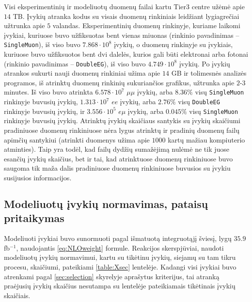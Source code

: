 \documentclass[a4paper, 12pt]{article}
\newcommand{\ttt}[1]{\texttt{#1}}
\newcommand{\emu}{e\mu}
\newcommand{\mumu}{\mu\mu}
\newcommand{\invfb}{fb$^{-1}$}
\newlength\q
\begin{document}
Visi eksperimentinių ir modeliuotų duomenų failai kartu Tier3 centre užėmė apie $14$ TB.
Įvykių atranka kodus su visais duomenų rinkiniais leidžiant lygiagrečiai užtrunka apie $5$ valandas.
Eksperimentinių duomenų rinkinyje, kuriame laikomi įvykiai, kuriuose buvo užfiksuotas bent vienas miuonas
(rinkinio pavadinimas -- \ttt{SingleMuon}), iš viso buvo $7.868 \cdot 10^8$ įvykių, o duomenų rinkinyje su įvykiais,
kuriuose buvo užfiksuotos bent dvi dalelės, kurios gali būti elektronai arba fotonai (rinkinio pavadinimas --
\ttt{DoubleEG}), iš viso buvo $4.749 \cdot 10^8$ įvykių.
Po įvykių atrankos sukurti nauji duomenų rinkiniai užima apie $14$ GB ir tolimesnės analizės programos, iš atrinktų
duomenų rinkinių sukuriančios grafikus, užtrunka apie $2$-$3$ minutes.
Iš viso buvo atrinkta $6.578 \cdot 10^7$ $\mumu$ įvykių, arba $8.36\%$ visų \ttt{SingleMuon} rinkinyje buvusių įvykių,
$1.313 \cdot 10^7$ $ee$ įvykių, arba $2.76\%$ visų \ttt{DoubleEG} rinkinyje buvusių įvykių, ir $3.556 \cdot 10^5$
$\emu$ įvykių, arba $0.045\%$ visų \ttt{SingleMuon} rinkinyje buvusių įvykių.
Atrinktų įvykių skaičiaus santykis su įvykių skaičiumi pradiniuose duomenų rinkiniuose nėra lygus atrinktų ir pradinių
duomenų failų apimčių santykiui (atrinkti duomenys užima apie $1000$ kartų mažiau kompiuterio atminties).
Taip yra todėl, kad failų dydžių sumažėjimą nulėmė ne tik juose esančių įvykių skaičius, bet ir tai, kad atrinktuose
duomenų rinkiniuose buvo saugoma tik maža dalis pradiniuose duomenų rinkiniuose buvusios su įvykiu susijusios
informacijos.


\subsection{Modeliuotų įvykių normavimas, pataisų pritaikymas} \label{sec:ppResults}

Modeliuoti įvykiai buvo sunormuoti pagal išmatuotą integruotąjį šviesį, lygų $35.9$ \invfb, naudojantis \eqref{eq:NLOweight}
formule.
Reakcijos skerspjūviai, naudoti modeliuotų įvykių normavimui, kartu su tikėtinu įvykių, siejamų su tam tikru procesu,
skaičiumi, pateikiami \ref{table:Xsec} lentelėje.
Kadangi visi įvykiai buvo atrenkami pagal \ref{sec:selection} skyrelyje aprašytus kriterijus, tai atranką praėjusių
įvykių skaičius nesutampa su lentelėje pateikiamais tikėtinais įvykių skaičiais.
\end{document}
